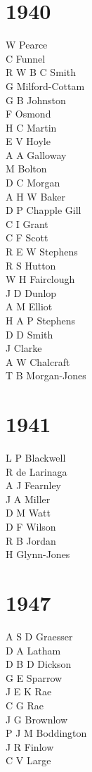 \begin{multicols}{2}
  \section*{1940}
  W Pearce \\
  C Funnel \\
  R W B C Smith \\
  G Milford-Cottam \\
  G B Johnston \\
  F Osmond \\
  H C Martin \\
  E V Hoyle \\
  A A Galloway \\
  M Bolton \\
  D C Morgan \\
  A H W Baker \\
  D P Chapple Gill \\
  C I Grant \\
  C F Scott \\
  R E W Stephens \\
  R S Hutton \\
  W H Fairclough \\
  J D Dunlop \\
  A M Elliot \\
  H A P Stephens \\
  D D Smith \\
  J Clarke \\
  A W Chalcraft \\
  T B Morgan-Jones \\
  \section*{1941}
  L P Blackwell \\
  R de Larinaga \\
  A J Fearnley \\
  J A Miller \\
  D M Watt \\
  D F Wilson \\
  R B Jordan \\
  H Glynn-Jones \\
  \section*{1947}
  A S D Graesser \\
  D A Latham \\
  D B D Dickson \\
  G E Sparrow \\
  J E K Rae \\
  C G Rae \\
  J G Brownlow \\
  P J M Boddington \\
  J R Finlow \\
  C V Large \\

\end{multicols}
